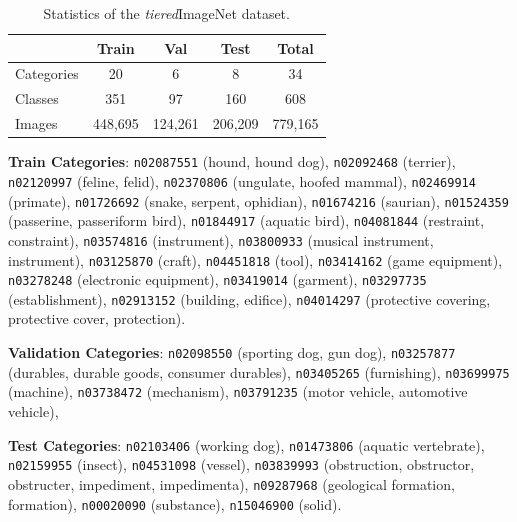 \begin{table}[ht]
    \center
    \caption{Statistics of the \textit{tiered}ImageNet dataset.}
    \label{tab:tiered_stats}
    \begin{tabular}{l|cccc}
                   & Train   & Val & Test    & Total \\ \hline
        Categories & 20      & 6   & 8       & 34 \\
        Classes    & 351     & 97  & 160     & 608 \\
        Images     & 448,695 & 124,261   & 206,209 & 779,165 \\
    \end{tabular}
\end{table}

\textbf{Train Categories}:  
\texttt{n02087551} (hound, hound dog), 
\texttt{n02092468} (terrier),  
\texttt{n02120997} (feline, felid),  
\texttt{n02370806} (ungulate, hoofed mammal),
\texttt{n02469914} (primate),  
\texttt{n01726692} (snake, serpent, ophidian),  
\texttt{n01674216} (saurian),
\texttt{n01524359} (passerine, passeriform bird),  
\texttt{n01844917} (aquatic bird),  
\texttt{n04081844} (restraint, constraint),  
\texttt{n03574816} (instrument),  
\texttt{n03800933} (musical instrument, instrument),  
\texttt{n03125870} (craft),
\texttt{n04451818} (tool),  
\texttt{n03414162} (game equipment),
\texttt{n03278248} (electronic equipment),  
\texttt{n03419014} (garment), 
\texttt{n03297735} (establishment), 
\texttt{n02913152} (building, edifice),
\texttt{n04014297} (protective covering, protective cover, protection).

\textbf{Validation Categories}: 
\texttt{n02098550} (sporting dog, gun dog),
\texttt{n03257877} (durables, durable goods, consumer durables),
\texttt{n03405265} (furnishing),
\texttt{n03699975} (machine),  
\texttt{n03738472} (mechanism),
\texttt{n03791235} (motor vehicle, automotive vehicle), 


\textbf{Test Categories}: \texttt{n02103406} (working dog),  \texttt{n01473806} (aquatic vertebrate),
\texttt{n02159955} (insect), \texttt{n04531098} (vessel),
\texttt{n03839993} (obstruction, obstructor, obstructer, impediment, impedimenta),
\texttt{n09287968} (geological formation, formation), \texttt{n00020090} (substance),  \texttt{n15046900} (solid).



